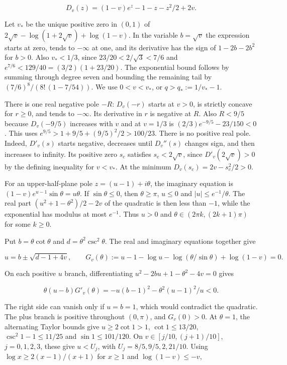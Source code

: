 \documentclass[11pt]{article}
\begin{document}
\[
D_v(z)=(1-v)e^z-1-z-z^2/2+2v.
\tag{1}
\]

Let $v_*$ be the unique positive zero in $(0,1)$ of $2\sqrt v-\log(1+2\sqrt v)+\log(1-v)$. In the variable $b=\sqrt v$ the expression starts at zero, tends to $-\infty$ at one, and its derivative has the sign of $1-2b-2b^2$ for $b>0$. Also $v_*<1/3$, since $23/20<2/\sqrt3<7/6$ and $e^{7/6}<129/40=(3/2)(1+23/20)$. The exponential bound follows by summing through degree seven and bounding the remaining tail by $(7/6)^8/(8!\,(1-7/54))$. We use $0<v<v_*$, or $q>q_*:=1/v_*-1$.

There is one real negative pole $-R$: $D_v(-r)$ starts at $v>0$, is strictly concave for $r\ge0$, and tends to $-\infty$. Its derivative in $r$ is negative at $R$. Also $R<9/5$ because $D_v(-9/5)$ increases with $v$ and at $v=1/3$ is $(2/3)e^{-9/5}-23/150<0$. This uses $e^{9/5}>1+9/5+(9/5)^2/2>100/23$. There is no positive real pole. Indeed, $D'_v(s)$ starts negative, decreases until $D_v''(s)$ changes sign, and then increases to infinity. Its positive zero $s_c$ satisfies $s_c<2\sqrt v$, since $D'_v(2\sqrt v)>0$ by the defining inequality for $v<v_*$. At the minimum $D_v(s_c)=2v-s_c^2/2>0$.

For an upper-half-plane pole $z=(u-1)+i\theta$, the imaginary equation is $(1-v)e^{u-1}\sin\theta=u\theta$. If $\sin\theta\le0$, then $\theta\ge\pi$, $u\le0$ and $|u|\le e^{-1}/\theta$. The real part $(u^2+1-\theta^2)/2-2v$ of the quadratic is then less than $-1$, while the exponential has modulus at most $e^{-1}$. Thus $u>0$ and $\theta\in(2\pi k,(2k+1)\pi)$ for some $k\ge0$.

Put $b=\theta\cot\theta$ and $d=\theta^2\csc^2\theta$. The real and imaginary equations together give

\[
u=b\pm\sqrt{d-1+4v},\qquad
G_v(\theta):=u-1-\log u-\log(\theta/\sin\theta)+\log(1-v)=0.
\tag{2}
\]

On each positive $u$ branch, differentiating $u^2-2bu+1-\theta^2-4v=0$ gives

\[
\theta(u-b)G'_v(\theta)=-u(b-1)^2-\theta^2(u-1)^2/u<0.
\tag{3}
\]

The right side can vanish only if $u=b=1$, which would contradict the quadratic. The plus branch is positive throughout $(0,\pi)$, and $G_v(0)>0$. At $\theta=1$, the alternating Taylor bounds give $u\ge2\cot1>1$, $\cot1\le13/20$, $\csc^2 1-1\le11/25$ and $\sin1\le101/120$. On $v\in[j/10,(j+1)/10]$, $j=0,1,2,3$, these give $u<U_j$, with $U_j=8/5,9/5,2,21/10$. Using $\log x\ge2(x-1)/(x+1)$ for $x\ge1$ and $\log(1-v)\le-v$,
\end{document}
